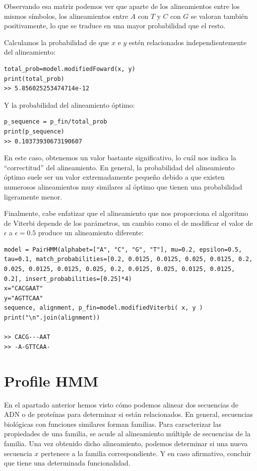 \begin{exampleth}
Observando esa matriz podemos ver que aparte de los alineamientos entre los mismos símbolos, los alineamientos entre $A$ con $T$ y $C$ con $G$ se valoran también positivamente, lo que se traduce en una mayor probabilidad que el resto. 

Calculamos la probabilidad de que $x$ e $y$ estén relacionados independientemente del alineamiento:
\begin{verbatim}
total_prob=model.modifiedFoward(x, y)
print(total_prob)
>> 5.856025253474714e-12
\end{verbatim}

Y la probabilidad del alineamiento óptimo:
\begin{verbatim}
p_sequence = p_fin/total_prob
print(p_sequence)
>> 0.10373930673190607
\end{verbatim}
En este caso, obtenemos un valor bastante significativo, lo cuál nos indica la \enquote{correctitud} del alineamiento. En general, la probabilidad del alineamiento óptimo suele ser un valor extremadamente pequeño debido a que existen numerosos alineamientos muy similares al óptimo que tienen una probabilidad ligeramente menor.

Finalmente, cabe enfatizar que el alineamiento que nos proporciona el algoritmo de Viterbi depende de los parámetros, un cambio como el de modificar el valor de $\epsilon$ a $\epsilon=0.5$ produce un alineamiento diferente:

\begin{verbatim}
model = PairHMM(alphabet=["A", "C", "G", "T"], mu=0.2, epsilon=0.5, tau=0.1, match_probabilities=[0.2, 0.0125, 0.0125, 0.025, 0.0125, 0.2, 0.025, 0.0125, 0.0125, 0.025, 0.2, 0.0125, 0.025, 0.0125, 0.0125, 0.2], insert_probabilities=[0.25]*4)
x="CACGAAT"
y="AGTTCAA"
sequence, alignment, p_fin=model.modifiedViterbi( x, y )
print("\n".join(alignment))

>> CACG---AAT
>> -A-GTTCAA-
\end{verbatim}
\end{exampleth}

\section{Profile HMM}
En el apartado anterior hemos visto cómo podemos alinear dos secuencias de ADN o de proteínas para determinar si están relacionados. En general, secuencias biológicas con funciones similares forman familias. Para caracterizar las propiedades de una familia, se acude al alineamiento múltiple de secuencias de la familia. Una vez obtenido dicho alineamiento, podemos determinar si una nueva secuencia $x$ pertenece a la familia correspondiente. Y en caso afirmativo, concluir que tiene una determinada funcionalidad. 

